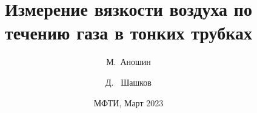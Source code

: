 \documentclass[xcolor=table]{beamer}
\title[Измерение вязкости газа] %
{Измерение вязкости воздуха по
течению газа в тонких трубках}
\author[Аношин, Шашков] 
{М.~Аношин\inst{1} \and Д. ~Шашков\inst{1}}
\date[11.03.2023] 
{МФТИ, Март 2023}
\begin{document}
\frame{\titlepage}


\end{document}

